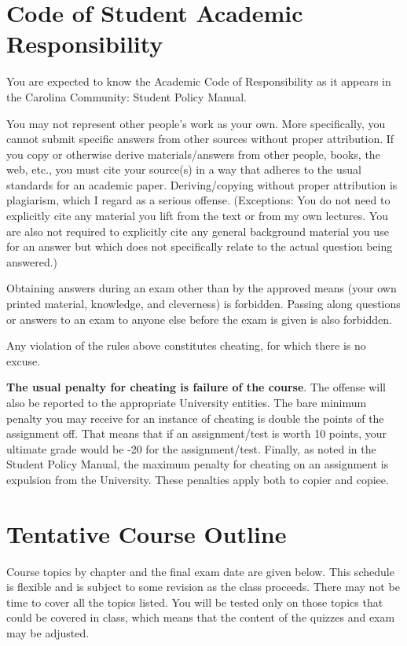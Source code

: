 \documentclass[11pt]{article}
\begin{document}
\section{Code of Student Academic Responsibility}
You are expected to know the Academic Code of Responsibility as it
appears in the Carolina Community: Student Policy Manual.

You may not represent other people's work as your own. More
specifically, you cannot submit specific answers from other sources
without proper attribution. If you copy or otherwise derive
materials/answers from other people, books, the web, etc., you must
cite your source(s) in a way that adheres to the usual standards for
an academic paper. Deriving/copying without proper attribution is
plagiarism, which I regard as a serious offense. (Exceptions: You do
not need to explicitly cite any material you lift from the text or
from my own lectures. You are also not required to explicitly cite any
general background material you use for an answer but which does not
specifically relate to the actual question being answered.)

Obtaining answers during an exam other than by the approved means
(your own printed material, knowledge, and cleverness) is forbidden.
Passing along questions or answers to an exam to anyone else before
the exam is given is also forbidden.

Any violation of the rules above constitutes cheating, for which there
is no excuse.

\textbf{The usual penalty for cheating is failure of the course}. The offense
will also be reported to the appropriate University entities. The bare
minimum penalty you may receive for an instance of cheating is double
the points of the assignment off. That means that if an
assignment/test is worth 10 points, your ultimate grade would be -20
for the assignment/test. Finally, as noted in the Student Policy
Manual, the maximum penalty for cheating on an assignment is expulsion
from the University. These penalties apply both to copier and copiee.

\newpage
\section{Tentative Course Outline}
Course topics by chapter and the final exam date are given below.
This schedule is flexible and is subject to some revision as the
class proceeds. There may not be time to cover all the topics listed.
You will be tested only on those topics that could be covered in
class, which means that the content of the quizzes and exam may be
adjusted.
\end{document}
